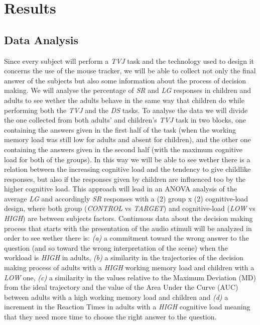 \documentclass[10pt, a4]{article}
\begin{document}
\section{Results}
\subsection{Data Analysis}
Since every subject will perform a \textit{TVJ} task and the technology used to design it concerns the use of the mouse tracker,
we will be able to collect not only the final answer of the subjects but also some information about the process of decision
making. We will analyse the percentage of \textit{SR} and \textit{LG} responses in children and adults to see wether
the adults behave in the same way that children do while performing both the \textit{TVJ} and the \textit{DS} tasks.
To analyse the data we will divide the one collected from both adults' and children's \textit{TVJ} task in two blocks, one containing 
the answers given in the first half of the task (when the working memory load was still low for adults and absent
for children), and the other one containing the answers given in the second half (with the maximum cognitive load for both of
the groups). In this way we will be able to see wether there is a relation between the increasing cognitive load and the tendency
to give childlike responses, but also if the responses given by children are influenced too by the higher cognitive load.
This approach will lead in an ANOVA analysis of the average \textit{LG} and accordingly \textit{SR} responses with a (2) group
x (2) cognitive-load design, where both group (\textit{CONTROL} vs \textit{TARGET}) and cognitive-load
(\textit{LOW} vs \textit{HIGH}) are between subjects factors.
Continuous data about the decision making process that starts with the presentation of the audio stimuli will be analyzed
in order to see wether there is: \textit{(a)} a commitment toward the wrong answer to the question (and so toward the
wrong interpretation of the scene) when the workload is \textit{HIGH} in adults, \textit{(b)} a similarity in the trajectories of the
decision making process of adults with a \textit{HIGH} working memory load and children with a \textit{LOW} one, \textit{(c)} a similarity in the values
relative to the Maximum Deviation (MD) from the ideal trajectory and the value of the Area Under the Curve (AUC) between
adults with a high working memory load and children and \textit{(d)} a increment in the Reaction Times in adults with a \textit{HIGH}
cognitive load meaning that they need more time to choose the right answer to the question.
\end{document}
